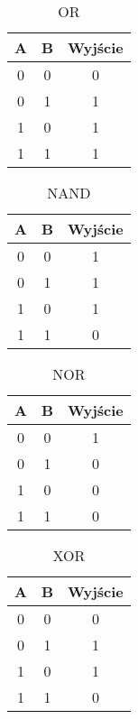\documentclass[12pt, letterpaper, titlepage]{article}
\begin{document}
\begin{table}[h]
\centering
\caption*{OR}
\begin{tabular}{ c  c | c }
\hline
\hline
A & B & Wyjście\\
\hline
0 & 0 & 0\\
0 & 1 & 1\\
1 & 0 & 1\\
1 & 1 & 1\\
\hline
\hline
\end{tabular}
\end{table}

\begin{table}[h]
\centering
\caption*{NAND}
\begin{tabular}{ c  c | c }
\hline
\hline
A & B & Wyjście\\
\hline
0 & 0 & 1\\
0 & 1 & 1\\
1 & 0 & 1\\
1 & 1 & 0\\
\hline
\hline
\end{tabular}
\end{table}

\begin{table}[h]
\centering
\caption*{NOR}
\begin{tabular}{ c  c | c }
\hline
\hline
A & B & Wyjście\\
\hline
0 & 0 & 1\\
0 & 1 & 0\\
1 & 0 & 0\\
1 & 1 & 0\\
\hline
\hline
\end{tabular}
\end{table}

\begin{table}[h]
\centering
\caption*{XOR}
\begin{tabular}{ c  c | c }
\hline
\hline
A & B & Wyjście\\
\hline
0 & 0 & 0\\
0 & 1 & 1\\
1 & 0 & 1\\
1 & 1 & 0\\
\hline
\hline
\end{tabular}
\end{table}
\end{document}
